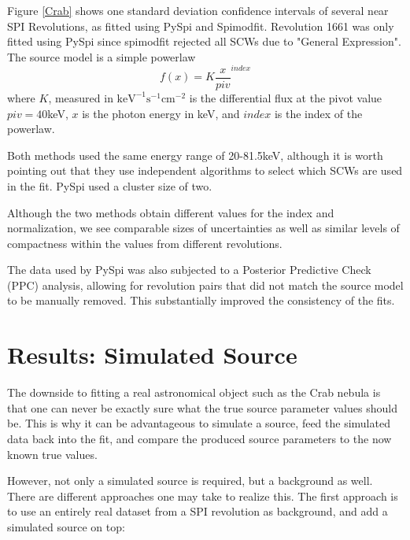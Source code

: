 \documentclass{article}
\begin{document}
Figure \ref{Crab} shows one standard deviation confidence intervals of several near SPI Revolutions, as fitted using PySpi and Spimodfit. Revolution 1661 was only fitted using PySpi since spimodfit rejected all SCWs due to "General Expression". The source model is a simple powerlaw 
\begin{equation} \label{powerlaw}
    f(x) = K \frac{x}{piv}^{index}
\end{equation}
where $K$, measured in $\text{keV}^{-1}\text{s}^{-1}\text{cm}^{-2}$ is the differential flux at the pivot value $piv=40$keV, $x$ is the photon energy in keV, and $index$ is the index of the powerlaw.

Both methods used the same energy range of 20-81.5keV, although it is worth pointing out that they use independent algorithms to select which SCWs are used in the fit. PySpi used a cluster size of two. 

Although the two methods obtain different values for the index and normalization, we see comparable sizes of uncertainties as well as similar levels of compactness within the values from different revolutions. 

The data used by PySpi was also subjected to a Posterior Predictive Check (PPC) analysis, allowing for revolution pairs that did not match the source model to be manually removed. This substantially improved the consistency of the fits.

\section{Results: Simulated Source}
The downside to fitting a real astronomical object such as the Crab nebula is that one can never be exactly sure what the true source parameter values should be. This is why it can be advantageous to simulate a source, feed the simulated data back into the fit, and compare the produced source parameters to the now known true values.

However, not only a simulated source is required, but a background as well. There are different approaches one may take to realize this. The first approach is to use an entirely real dataset from a SPI revolution as background, and add a simulated source on top:
\end{document}
